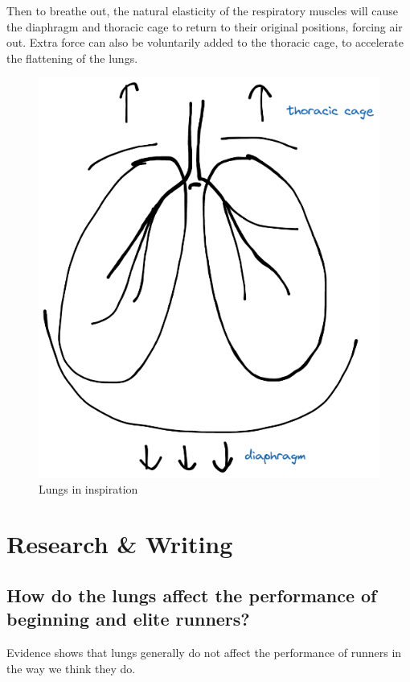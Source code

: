 \documentclass[index]{subfiles}
\begin{document}
Then to breathe out, the natural elasticity of the respiratory muscles will cause the diaphragm and thoracic cage to return to their original positions, forcing air out. Extra force can also be voluntarily added to the thoracic cage, to accelerate the flattening of the lungs.

\begin{figure}[H]
    \centering
    \includegraphics[scale=0.3]{lungs.png}
    \caption{Lungs in inspiration}
\end{figure}

\section{Research & Writing}

\subsection{How do the lungs affect the performance of beginning and elite runners?}

Evidence shows that lungs generally do not affect the performance of runners in the way we think they do.
\end{document}
